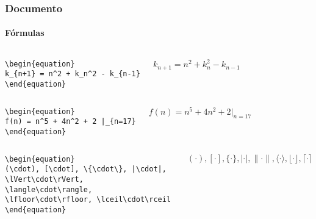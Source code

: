 \begin{frame}[fragile]
\frametitle{Documento}
\framesubtitle{Fórmulas}
  \scriptsize
  \begin{columns}[c]
  \begin{verbatim}
\begin{equation}
k_{n+1} = n^2 + k_n^2 - k_{n-1}
\end{equation}
  \end{verbatim}
  \begin{fmpage}{\textwidth}
\begin{equation}
k_{n+1} = n^2 + k_n^2 - k_{n-1}
\end{equation}
  \end{fmpage}
  \end{columns}


  \begin{columns}[c]
  \begin{verbatim}
\begin{equation}
f(n) = n^5 + 4n^2 + 2 |_{n=17}
\end{equation}
  \end{verbatim}
  \begin{fmpage}{\textwidth}
\begin{equation}
f(n) = n^5 + 4n^2 + 2 |_{n=17}
\end{equation}
  \end{fmpage}
  \end{columns}


  \begin{columns}[c]
  \begin{verbatim}
\begin{equation}
(\cdot), [\cdot], \{\cdot\}, |\cdot|, 
\lVert\cdot\rVert, \langle\cdot\rangle, 
\lfloor\cdot\rfloor, \lceil\cdot\rceil
\end{equation}
  \end{verbatim} 
  \begin{fmpage}{\textwidth}
\begin{equation}
(\cdot), [\cdot], \{\cdot\}, |\cdot|, \lVert\cdot\rVert, \langle\cdot\rangle, \lfloor\cdot\rfloor, \lceil\cdot\rceil
\end{equation}
  \end{fmpage}
  \end{columns}
\end{frame}


